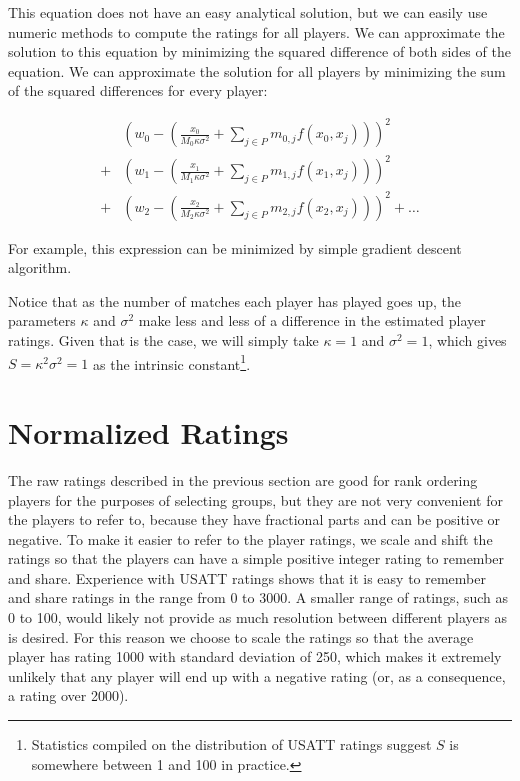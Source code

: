 \documentclass{article}
\begin{document}
This equation does not have an easy analytical solution, but we can easily use
numeric methods to compute the ratings for all players. We can approximate the
solution to this equation by minimizing the squared difference of both sides
of the equation. We can approximate the solution for all players by minimizing
the sum of the squared differences for every player:

\begin{align*}
    &(w_0 - (\frac{x_0}{M_0 \kappa \sigma^2} + \sum_{j \in P} m_{0, j} f(x_0, x_j)))^2 \\
  + &(w_1 - (\frac{x_1}{M_1 \kappa \sigma^2} + \sum_{j \in P} m_{1, j} f(x_1, x_j)))^2 \\
  + &(w_2 - (\frac{x_2}{M_2 \kappa \sigma^2} + \sum_{j \in P} m_{2, j} f(x_2, x_j)))^2 + \ldots
\end{align*}

For example, this expression can be minimized by simple gradient descent
algorithm.

Notice that as the number of matches each player has played goes up, the
parameters $\kappa$ and $\sigma^2$ make less and less of a difference in the
estimated player ratings. Given that is the case, we will simply take $\kappa = 1$
and $\sigma^2 = 1$, which gives $S = \kappa^2 \sigma^2 = 1$ as the intrinsic
constant\footnote{Statistics compiled on the distribution of USATT ratings
  suggest $S$ is somewhere between 1 and 100 in practice.}.

\section{Normalized Ratings}
The raw ratings described in the previous section are good for rank ordering
players for the purposes of selecting groups, but they are not very convenient
for the players to refer to, because they have fractional parts and can be
positive or negative. To make it easier to refer to the player ratings, we
scale and shift the ratings so that the players can have a simple positive
integer rating to remember and share. Experience with USATT ratings shows that
it is easy to remember and share ratings in the range from 0 to 3000. A
smaller range of ratings, such as 0 to 100, would likely not provide as much
resolution between different players as is desired. For this reason we choose
to scale the ratings so that the average player has rating 1000 with standard
deviation of 250, which makes it extremely unlikely that any player will end
up with a negative rating (or, as a consequence, a rating over 2000).
\end{document}
